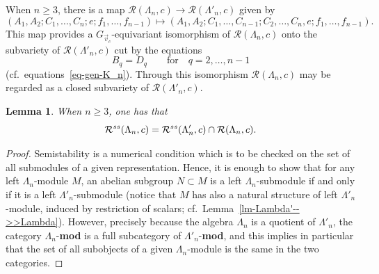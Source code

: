 \documentclass[11pt]{article}
\numberwithin{equation}{section}
\numberwithin{equation}{section}
\newtheorem{Lemma}[Theorem]{Lemma}
\begin{document}
When $n\geq 3$, there is a map $\mathcal{R}(\Lambda_{n}, c) \longrightarrow \mathcal{R}(\Lambda'_{n}, c)$ given by
\begin{equation*}
(A_1,A_2;C_1,\dots,C_n;e;f_1,\dots,f_{n-1}) \mapsto
(A_1,A_2;C_1,\dots,C_{n-1};C_{2},\dots,C_{n},e;f_1,\dots,f_{n-1}) .
\end{equation*}
This map provides a $G_{\vec{v}_{c}}$-equivariant isomorphism of $\mathcal{R}(\Lambda_{n}, c)$ onto the subvariety of $\mathcal{R}(\Lambda'_{n}, c)$ cut by the equations
\begin{equation*}
B_{q}=D_{q}\qquad\text{for}\quad q=2,\dots,n-1
\end{equation*}
(cf.\ equations~\eqref{eq-gen-K_n}). Through this isomorphism $\mathcal{R}(\Lambda_{n}, c)$ may be regarded as a closed subvariety of $\mathcal{R}(\Lambda'_{n}, c)$.
\begin{Lemma}\label{lm-R_n(c)-in-R'_n(c)}
When $n\geq 3$, one has that
\begin{equation*}
\mathcal{R}^{\rm ss}(\Lambda_{n}, c) =\mathcal{R}^{\rm ss}(\Lambda'_{n}, c) \cap \mathcal{R}(\Lambda_{n}, c) .
\end{equation*}
\end{Lemma}
\begin{proof}Semistability is a numerical condition which is to be checked on the set of all submodules of a given representation. Hence, it is enough to show that for any left $\Lambda_{n}$-module $M$, an abelian subgroup $N\subset M$ is a left $\Lambda_{n}$-submodule if and only if it is a left $\Lambda'_{n}$-submodule (notice that $M$ has also a natural structure of left $\Lambda'_{n}$-module, induced by restriction of scalars; cf.\ Lemma~\ref{lm-Lambda'-->>Lambda}).
However, precisely because the algebra $\Lambda_n$ is a quotient of $\Lambda'_n$,
the category $\Lambda_{n}$-{\bf mod} is a full subcategory of $\Lambda'_{n}$-{\bf mod}, and this implies in particular that the set of all subobjects of a given $\Lambda_n$-module is the same in the two categories.
\end{proof}
\end{document}
